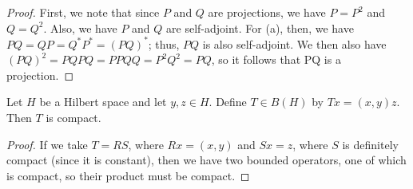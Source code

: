 \documentclass[12pt,letterpaper,twoside]{hmcpset}
\begin{document}
\begin{solution}
  \begin{proof}
    \label{prf:3}
    First, we note that since $P$ and $Q$ are projections, we have $P = P^2$ and $Q = Q^2$.
    Also, we have $P$ and $Q$ are self-adjoint.
    For (a), then, we have $PQ = QP = Q^* P^* = (PQ)^*$; thus, $PQ$ is also self-adjoint.
    We then also have $(PQ)^2 = PQPQ = PPQQ = P^2Q^2 = PQ$, so it follows that PQ is a projection.
  \end{proof}
\end{solution}

\begin{problem}[6]
  Let $H$ be a Hilbert space and let $y,z \in H$.  Define $T \in B(H)$ by $Tx = (x,y)z$. Then $T$ is compact.
\end{problem}

\begin{solution}
  \begin{proof}
    \label{prf:4}
    If we take $T = RS$, where $Rx = (x,y)$ and $Sx = z$, where $S$ is definitely compact (since it is constant), then we have two bounded operators, one of which is compact, so their product must be compact.
  \end{proof}
\end{solution}
\end{document}
